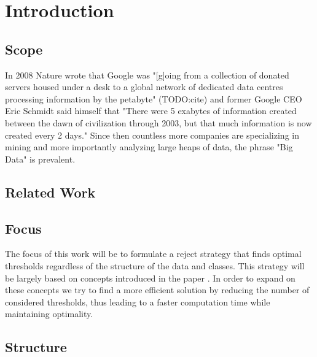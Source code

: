 %
\chapter{Introduction}
\label{sec:intro}

\section{Scope}
In 2008 Nature wrote that Google was "[g]oing from a collection of donated servers housed under a desk to a global network of dedicated data centres processing information by the petabyte" (TODO:cite) and former Google CEO Eric Schmidt said himself that "There were 5 exabytes of information created between the dawn of civilization through 2003, but that much information is now created every 2 days." Since then countless more companies are specializing in mining and more importantly analyzing large heaps of data, the phrase "Big Data" is prevalent.

\section{Related Work}

\section{Focus}
The focus of this work will be to formulate a reject strategy that finds optimal thresholds regardless of the  structure of the data and classes. This strategy will be largely based on concepts introduced in the paper \cite{Fis:2015}. In order to expand on these concepts we try to find a more efficient solution by reducing the number of considered thresholds, thus leading to a faster computation time while maintaining optimality.

\section{Structure}
